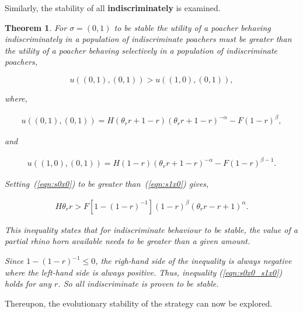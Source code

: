 \documentclass[10pt]{article}
\newtheorem{theorem}{Theorem}
\begin{document}
Similarly, the stability of all \textbf{indiscriminately} is examined.

\begin{theorem}
	For \(\sigma=(0, 1)\) to be stable the utility of a poacher behaving 
	indiscriminately in a population of indiscriminate poachers must be greater
	than the utility of a poacher behaving selectively in a population of 
	indiscriminate poachers,

	\begin{equation}
	u((0, 1),(0, 1)) > u((1, 0),(0, 1)),
	\end{equation}

	where,

	\begin{eqnarray}
	\label{eqn:s0x0}
 	u((0, 1), (0, 1)) = H(\theta_r r + 1 - r)(\theta_r r + 1 - r)^{-\alpha}  - F(1 - r)^{\beta},
	\end{eqnarray}

	and 

	\begin{eqnarray}
	\label{eqn:s1x0}
	u((1, 0),(0, 1)) = H(1 - r)(\theta_r r + 1 - r)^{-\alpha} - F(1 - r)^{\beta-1}.
	\end{eqnarray}

	Setting~(\ref{eqn:s0x0}) to be greater than~(\ref{eqn:s1x0}) gives,

	\begin{eqnarray}
	\label{eqn:s0x0_s1x0}
	H \theta_r r  > F [1 - (1 - r)^{-1}](1 - r)^{\beta}(\theta_r r - r + 1)^{\alpha}.
	\end{eqnarray}

	This inequality states that for indiscriminate behaviour to be stable, the value of
	a partial rhino horn available needs to be greater than a given amount. 

	Since \(1-(1-r)^{-1} \leq 0\), the righ-hand side of the inequality is always
	negative where the left-hand side is always positive. Thus, inequality 
	(\ref{eqn:s0x0_s1x0}) holds for any \(r\). So all indiscriminate
	is proven to be stable.
\end{theorem}

Thereupon, the evolutionary stability of the strategy can now be explored. 
\end{document}
